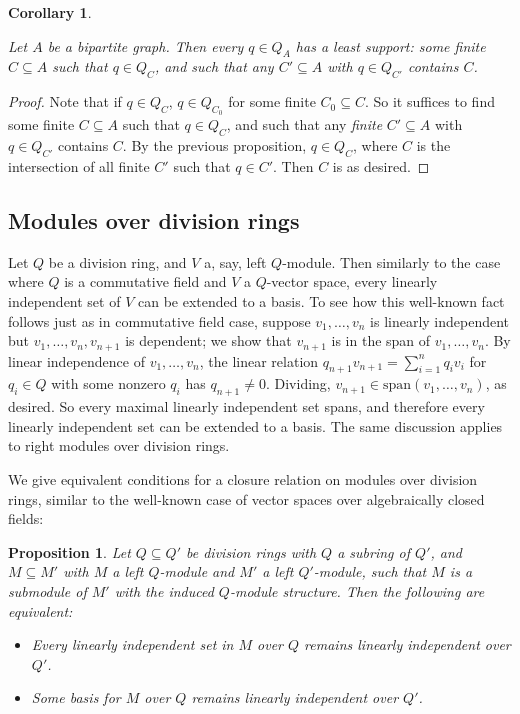 \documentclass{amsart}
\newtheorem{cor}[theorem]{Corollary}
\newtheorem{prop}[theorem]{Proposition}
\theoremstyle{definition}
\theoremstyle{remark}
\numberwithin{equation}{section}
\begin{document}
\begin{cor}\label{least support}

Let $A$ be a bipartite graph. Then every $q\in Q_{A}$ has a \emph{least support}: some finite $C \subseteq A $ such that $q\in Q_C$, and such that any $C' \subseteq A$ with $q\in Q_{C'}$ contains $C$. 

\end{cor}

\begin{proof}
    Note that if $q \in Q_{C}$, $q \in Q_{C_0}$ for some finite $C_0 \subseteq C$.  So it suffices to find some finite $C \subseteq A $ such that $q\in Q_C$, and such that any \textit{finite} $C' \subseteq A$ with $q\in Q_{C'}$ contains $C$. By the previous proposition, $q \in Q_{C}$, where $C$ is the intersection of all finite $C'$ such that $q\in C'$. Then $C$ is as desired.
\end{proof}

\subsection{Modules over division rings}\label{modules over division rings}

Let $Q$ be a division ring, and $V$ a, say, left $Q$-module. Then similarly to the case where $Q$ is a commutative field and $V$ a $Q$-vector space, every linearly independent set of $V$ can be extended to a basis. To see how this well-known fact follows just as in commutative field case, suppose $v_{1}, \ldots, v_{n}$ is linearly independent but $v_{1}, \ldots, v_{n}, v_{n+1}$ is dependent; we show that $v_{n+1}$ is in the span of $v_{1}, \ldots, v_{n}$. By linear independence of $v_{1}, \ldots, v_{n}$, the linear relation $q_{n+1}v_{n+1} = \sum^{n}_{i=1} q_{i}v_{i}$ for $q_{i} \in Q$ with some nonzero $q_{i}$ has $q_{n+1} \neq 0$. Dividing, $v_{n+1} \in \mathrm{span}( v_{1}, \ldots, v_{n})$, as desired. So every maximal linearly independent set spans, and therefore every linearly independent set can be extended to a basis. The same discussion applies to right modules over division rings.


We give equivalent conditions for a closure relation on modules over division rings, similar to the well-known case of vector spaces over algebraically closed fields:

\begin{prop}\label{strong inclusion}
    Let $Q \subseteq Q'$ be division rings with $Q$ a subring of $Q'$, and $M \subseteq M'$ with $M$ a left $Q$-module and $M'$ a left $Q'$-module, such that $M$ is a submodule of $M'$ with the induced $Q$-module structure. Then the following are equivalent:

    \begin{itemize}
        \item Every linearly independent set in $M$ over $Q$ remains linearly independent over $Q'$.

        \item Some basis for $M$ over $Q$ remains linearly independent over $Q'$.
    \end{itemize}
\end{prop}
\end{document}
